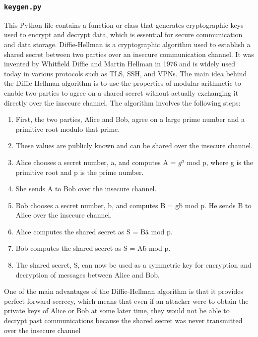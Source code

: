 \documentclass{article}
\begin{document}
\subsubsection{\texttt{keygen.py}}
This Python file contains a function or class that generates cryptographic keys used to encrypt and decrypt data, which is essential for secure communication and data storage.
Diffie-Hellman is a cryptographic algorithm used to establish a shared secret between two parties over an insecure communication channel.
It was invented by Whitfield Diffie and Martin Hellman in 1976 and is widely used today in various protocols such as TLS, SSH, and VPNs.
The main idea behind the Diffie-Hellman algorithm is to use the properties of modular arithmetic to enable two parties to agree on a shared secret without actually exchanging it directly over the insecure channel.
The algorithm involves the following steps:
\begin{center}
    \begin{enumerate}
        \item First, the two parties, Alice and Bob, agree on a large prime number and a primitive root modulo that prime.
        \item These values are publicly known and can be shared over the insecure channel.
        \item Alice chooses a secret number, a, and computes A = $g^a$ mod p, where g is the primitive root and p is the prime number.
        \item She sends A to Bob over the insecure channel.
        \item Bob chooses a secret number, b, and computes B = g\^b mod p. He sends B to Alice over the insecure channel.
        \item Alice computes the shared secret as S = B\^a mod p.
        \item Bob computes the shared secret as S = A\^b mod p.
        \item The shared secret, S, can now be used as a symmetric key for encryption and decryption of messages between Alice and Bob.
    \end{enumerate}

\end{center}

One of the main advantages of the Diffie-Hellman algorithm is that it provides perfect forward secrecy, which means that even if an attacker were to obtain the private keys of Alice or Bob at some later time, they would not be able to decrypt past communications because the shared secret was never transmitted over the insecure channel
\end{document}
